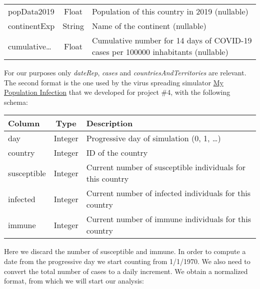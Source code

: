 \begin{center}
\begin{tabu}{l c X}
        popData2019             & Float   & Population of this country in 2019 (nullable)                                           \\
        continentExp            & String  & Name of the continent (nullable)                                                        \\
        cumulative\dots         & Float   & Cumulative number for 14 days of COVID-19 cases per \num{100000} inhabitants (nullable) \\
        \bottomrule
    \end{tabu}
\end{center}

\noindent
For our purposes only \emph{dateRep}, \emph{cases} and \emph{countriesAndTerritories} are relevant.
The second format is the one used by the virus spreading simulator \href{https://github.com/fuljo/my-population-infection}{My Population Infection} that we developed for project \#4, with the following schema:

\begin{center}
    \begin{tabu}{l c X}
        \toprule
        \rowfont{\sffamily\bfseries}
        Column      & Type    & Description                                                \\
        \midrule
        day         & Integer & Progressive day of simulation (0, 1, \dots)                \\
        country     & Integer & ID of the country                                          \\
        susceptible & Integer & Current number of susceptible individuals for this country \\
        infected    & Integer & Current number of infected individuals for this country    \\
        immune      & Integer & Current number of immune individuals for this country      \\
        \bottomrule
    \end{tabu}
\end{center}

\noindent
Here we discard the number of susceptible and immune. In order to compute a date from the progressive day we start counting from 1/1/1970. We also need to convert the total number of cases to a daily increment.
We obtain a normalized format, from which we will start our analysis:

